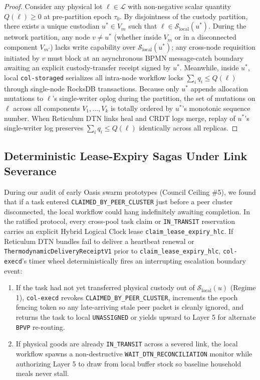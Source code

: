 \begin{proof}
Consider any physical lot $\ell \in \mathcal{L}$ with non-negative scalar quantity $Q(\ell) \ge 0$
at pre-partition epoch $\tau_0$. By disjointness of the custody partition, there exists a
unique custodian $u^* \in V_m$ such that $\ell \in \mathcal{S}_{\mathrm{local}}(u^*)$. During
the network partition, any node $v \neq u^*$ (whether inside $V_m$ or in a disconnected
component $V_{m'}$) lacks write capability over $\mathcal{S}_{\mathrm{local}}(u^*)$; any
cross-node requisition initiated by $v$ must block at an asynchronous BPMN message-catch
boundary awaiting an explicit custody-transfer receipt signed by $u^*$. Meanwhile, inside
$u^*$, local \texttt{col-storaged} serializes all intra-node workflow locks
$\sum_i q_i \le Q(\ell)$ through single-node RocksDB transactions. Because only $u^*$ appends
allocation mutations to $\ell$'s single-writer oplog during the partition, the set of mutations
on $\ell$ across all components $V_1, \dots, V_k$ is totally ordered by $u^*$'s monotonic
sequence number. When Reticulum DTN links heal and CRDT logs merge, replay of $u^*$'s
single-writer log preserves $\sum_i q_i \le Q(\ell)$ identically across all replicas.
\end{proof}

\subsection{Deterministic Lease-Expiry Sagas Under Link Severance}

During our audit of early Oasis swarm prototypes (Council Ceiling \#5), we found that if a task
entered \texttt{CLAIMED\_BY\_PEER\_CLUSTER} just before a peer cluster disconnected, the local
workflow could hang indefinitely awaiting completion. In the ratified protocol, every cross-pool
task claim or \texttt{IN\_TRANSIT} reservation carries an explicit Hybrid Logical Clock lease
\texttt{claim\_lease\_expiry\_hlc}. If Reticulum DTN bundles fail to deliver a heartbeat
renewal or \texttt{ThermodynamicDeliveryReceiptV1} prior to \texttt{claim\_lease\_expiry\_hlc},
\texttt{col-execd}'s timer wheel deterministically fires an interrupting escalation boundary
event:

\begin{enumerate}
    \item If the task had not yet transferred physical custody out of $\mathcal{S}_{\mathrm{local}}(u)$
    (Regime 1), \texttt{col-execd} revokes \texttt{CLAIMED\_BY\_PEER\_CLUSTER}, increments the
    epoch fencing token so any late-arriving stale peer packet is cleanly ignored, and returns
    the task to local \texttt{UNASSIGNED} or yields upward to Layer 5 for alternate
    \texttt{BPVP} re-routing.
    \item If physical goods are already \texttt{IN\_TRANSIT} across a severed link, the local
    workflow spawns a non-destructive \texttt{WAIT\_DTN\_RECONCILIATION} monitor while
    authorizing Layer 5 to draw from local buffer stock so baseline household meals never stall.
\end{enumerate}


